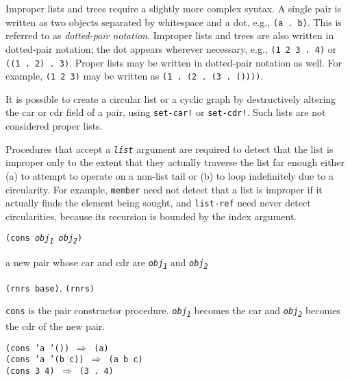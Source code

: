 Improper lists and trees require a slightly more complex syntax.
A single pair is written as two objects separated by whitespace and a dot,
e.g., \texttt{(a . b)}.
\label{objects_s35}This is referred to as \textit{dotted-pair notation}.
Improper lists and trees are also written in dotted-pair notation; the dot
appears wherever necessary, e.g., \texttt{(1 2 3 . 4)} or \texttt{((1 . 2) . 3)}.
Proper lists may be written in dotted-pair notation as well.
For example, \texttt{(1 2 3)} may be written as \texttt{(1 . (2 . (3 . ())))}.


\label{objects_s36}It is possible to create a circular list or a cyclic
graph by destructively
altering the car or cdr field of a pair, using \texttt{set-car!} or \texttt{set-cdr!}.
Such lists are not considered proper lists.


Procedures that accept a \texttt{\textit{list}} argument
are required to detect that the list is improper only to the extent that they
actually traverse the list far enough either (a) to attempt to operate on a
non-list tail or (b) to loop indefinitely due to a circularity.
For example, \texttt{member} need not detect that a list is improper if it
actually finds the element being sought, and \texttt{list-ref} need never
detect circularities, because its recursion is bounded by the index
argument.

\begin{description}

\label{objects_s37}\item[procedure] \texttt{(cons \textit{obj\textsubscript{1}} \textit{obj\textsubscript{2}})}



\item[returns] a new pair whose car and cdr are \texttt{\textit{obj\textsubscript{1}}} and \texttt{\textit{obj\textsubscript{2}}}


\item[libraries] \texttt{(rnrs base)}, \texttt{(rnrs)}
\end{description}

\texttt{cons} is the pair constructor procedure.
\texttt{\textit{obj\textsubscript{1}}} becomes the car and \texttt{\textit{obj\textsubscript{2}}} becomes the cdr of the
new pair.

\begin{alltt}
(cons 'a '()) \(\Rightarrow\) (a)
(cons 'a '(b c)) \(\Rightarrow\) (a b c)
(cons 3 4) \(\Rightarrow\) (3 . 4)
\end{alltt}

